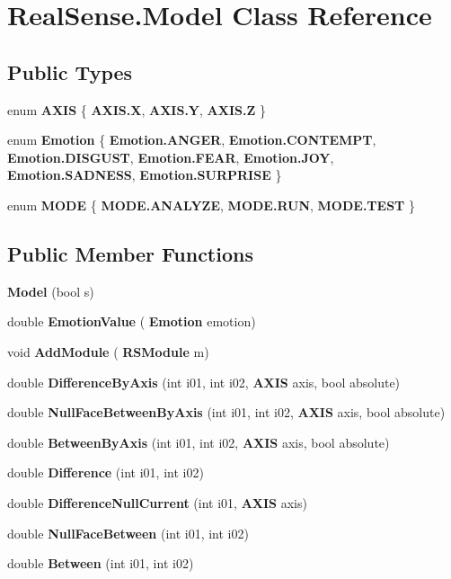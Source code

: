 \section{Real\+Sense.\+Model Class Reference}
\label{class_real_sense_1_1_model}
\subsection*{Public Types}
\begin{DoxyCompactItemize}
\item 
enum \textbf{ A\+X\+IS} \{ \textbf{ A\+X\+I\+S.\+X}, 
\textbf{ A\+X\+I\+S.\+Y}, 
\textbf{ A\+X\+I\+S.\+Z}
 \}
\item 
enum \textbf{ Emotion} \{ \newline
\textbf{ Emotion.\+A\+N\+G\+ER}, 
\textbf{ Emotion.\+C\+O\+N\+T\+E\+M\+PT}, 
\textbf{ Emotion.\+D\+I\+S\+G\+U\+ST}, 
\textbf{ Emotion.\+F\+E\+AR}, 
\newline
\textbf{ Emotion.\+J\+OY}, 
\textbf{ Emotion.\+S\+A\+D\+N\+E\+SS}, 
\textbf{ Emotion.\+S\+U\+R\+P\+R\+I\+SE}
 \}
\item 
enum \textbf{ M\+O\+DE} \{ \textbf{ M\+O\+D\+E.\+A\+N\+A\+L\+Y\+ZE}, 
\textbf{ M\+O\+D\+E.\+R\+UN}, 
\textbf{ M\+O\+D\+E.\+T\+E\+ST}
 \}
\end{DoxyCompactItemize}
\subsection*{Public Member Functions}
\begin{DoxyCompactItemize}
\item 
\textbf{ Model} (bool s)
\item 
double \textbf{ Emotion\+Value} (\textbf{ Emotion} emotion)
\item 
void \textbf{ Add\+Module} (\textbf{ R\+S\+Module} m)
\item 
double \textbf{ Difference\+By\+Axis} (int i01, int i02, \textbf{ A\+X\+IS} axis, bool absolute)
\item 
double \textbf{ Null\+Face\+Between\+By\+Axis} (int i01, int i02, \textbf{ A\+X\+IS} axis, bool absolute)
\item 
double \textbf{ Between\+By\+Axis} (int i01, int i02, \textbf{ A\+X\+IS} axis, bool absolute)
\item 
double \textbf{ Difference} (int i01, int i02)
\item 
double \textbf{ Difference\+Null\+Current} (int i01, \textbf{ A\+X\+IS} axis)
\item 
double \textbf{ Null\+Face\+Between} (int i01, int i02)
\item 
double \textbf{ Between} (int i01, int i02)
\end{DoxyCompactItemize}
